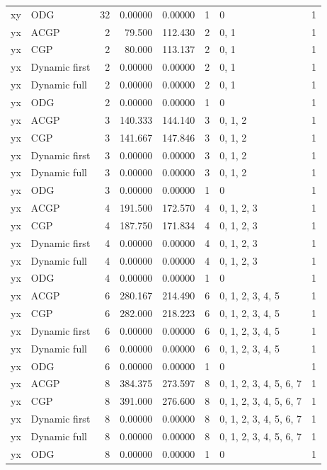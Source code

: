 \documentclass[10pt,a4paper]{article}
\begin{document}
\begin{longtable}{@{}p{23mm}p{29mm}rrrrp{36mm}r@{}}
xy & ODG & 32 & 0.00000 & 0.00000 & 1 & 0 & 1 \\
yx & ACGP & 2 & 79.500 & 112.430 & 2 & 0, 1 & 1 \\
yx & CGP & 2 & 80.000 & 113.137 & 2 & 0, 1 & 1 \\
yx & Dynamic first & 2 & 0.00000 & 0.00000 & 2 & 0, 1 & 1 \\
yx & Dynamic full & 2 & 0.00000 & 0.00000 & 2 & 0, 1 & 1 \\
yx & ODG & 2 & 0.00000 & 0.00000 & 1 & 0 & 1 \\
yx & ACGP & 3 & 140.333 & 144.140 & 3 & 0, 1, 2 & 1 \\
yx & CGP & 3 & 141.667 & 147.846 & 3 & 0, 1, 2 & 1 \\
yx & Dynamic first & 3 & 0.00000 & 0.00000 & 3 & 0, 1, 2 & 1 \\
yx & Dynamic full & 3 & 0.00000 & 0.00000 & 3 & 0, 1, 2 & 1 \\
yx & ODG & 3 & 0.00000 & 0.00000 & 1 & 0 & 1 \\
yx & ACGP & 4 & 191.500 & 172.570 & 4 & 0, 1, 2, 3 & 1 \\
yx & CGP & 4 & 187.750 & 171.834 & 4 & 0, 1, 2, 3 & 1 \\
yx & Dynamic first & 4 & 0.00000 & 0.00000 & 4 & 0, 1, 2, 3 & 1 \\
yx & Dynamic full & 4 & 0.00000 & 0.00000 & 4 & 0, 1, 2, 3 & 1 \\
yx & ODG & 4 & 0.00000 & 0.00000 & 1 & 0 & 1 \\
yx & ACGP & 6 & 280.167 & 214.490 & 6 & 0, 1, 2, 3, 4, 5 & 1 \\
yx & CGP & 6 & 282.000 & 218.223 & 6 & 0, 1, 2, 3, 4, 5 & 1 \\
yx & Dynamic first & 6 & 0.00000 & 0.00000 & 6 & 0, 1, 2, 3, 4, 5 & 1 \\
yx & Dynamic full & 6 & 0.00000 & 0.00000 & 6 & 0, 1, 2, 3, 4, 5 & 1 \\
yx & ODG & 6 & 0.00000 & 0.00000 & 1 & 0 & 1 \\
yx & ACGP & 8 & 384.375 & 273.597 & 8 & 0, 1, 2, 3, 4, 5, 6, 7 & 1 \\
yx & CGP & 8 & 391.000 & 276.600 & 8 & 0, 1, 2, 3, 4, 5, 6, 7 & 1 \\
yx & Dynamic first & 8 & 0.00000 & 0.00000 & 8 & 0, 1, 2, 3, 4, 5, 6, 7 & 1 \\
yx & Dynamic full & 8 & 0.00000 & 0.00000 & 8 & 0, 1, 2, 3, 4, 5, 6, 7 & 1 \\
yx & ODG & 8 & 0.00000 & 0.00000 & 1 & 0 & 1 \\

\end{longtable}
\end{document}
